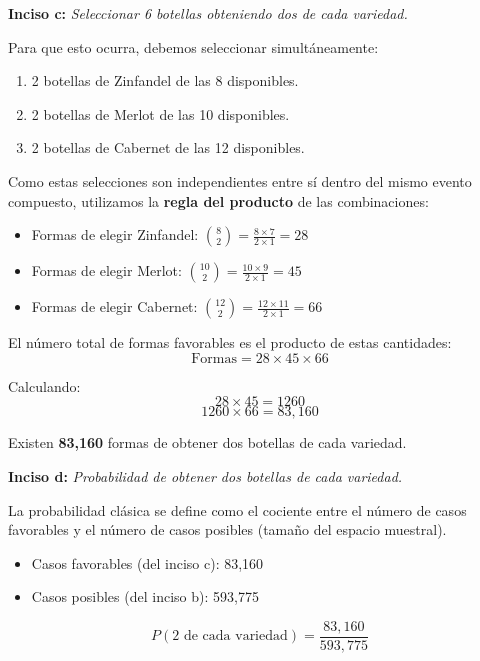 \documentclass[a4paper]{article}
\begin{document}
\vspace{0.3cm}

\textbf{Inciso c:} \textit{Seleccionar 6 botellas obteniendo dos de cada variedad.}

Para que esto ocurra, debemos seleccionar simultáneamente:
\begin{enumerate}
    \item 2 botellas de Zinfandel de las 8 disponibles.
    \item 2 botellas de Merlot de las 10 disponibles.
    \item 2 botellas de Cabernet de las 12 disponibles.
\end{enumerate}

Como estas selecciones son independientes entre sí dentro del mismo evento compuesto, utilizamos la \textbf{regla del producto} de las combinaciones:

\begin{itemize}
    \item Formas de elegir Zinfandel: $\binom{8}{2} = \frac{8 \times 7}{2 \times 1} = 28$
    \item Formas de elegir Merlot: $\binom{10}{2} = \frac{10 \times 9}{2 \times 1} = 45$
    \item Formas de elegir Cabernet: $\binom{12}{2} = \frac{12 \times 11}{2 \times 1} = 66$
\end{itemize}

El número total de formas favorables es el producto de estas cantidades:
$$ \text{Formas} = 28 \times 45 \times 66 $$

Calculando:
$$ 28 \times 45 = 1260 $$
$$ 1260 \times 66 = 83,160 $$

Existen \textbf{83,160} formas de obtener dos botellas de cada variedad.

\vspace{0.3cm}

\textbf{Inciso d:} \textit{Probabilidad de obtener dos botellas de cada variedad.}

La probabilidad clásica se define como el cociente entre el número de casos favorables y el número de casos posibles (tamaño del espacio muestral).

\begin{itemize}
    \item Casos favorables (del inciso c): 83,160
    \item Casos posibles (del inciso b): 593,775
\end{itemize}

$$ P(\text{2 de cada variedad}) = \frac{83,160}{593,775} $$
\end{document}
